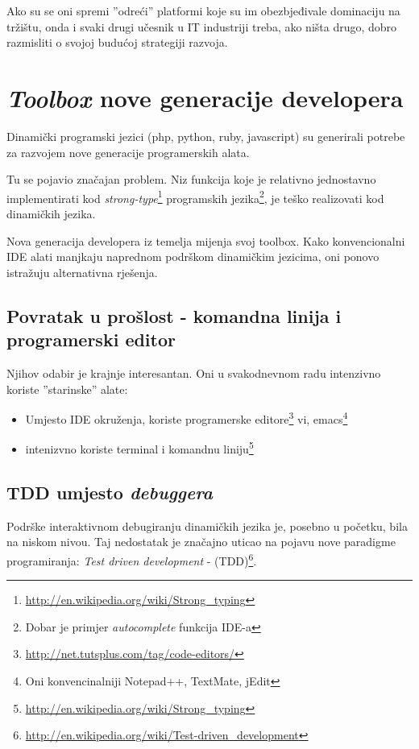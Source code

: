 \documentclass[times, utf8, seminar]{fit}
\begin{document}
Ako su se oni spremi ''odreći'' platformi koje su im obezbjeđivale dominaciju na tržištu, onda i svaki drugi učesnik u IT industriji treba, ako ništa drugo, dobro razmisliti o svojoj budućoj strategiji razvoja. 

\chapter{\emph{Toolbox} nove generacije developera}

Dinamički programski jezici (php, python, ruby, javascript) su generirali potrebe za razvojem nove generacije programerskih alata. 

Tu se pojavio značajan problem. Niz funkcija koje je relativno jednostavno implementirati kod \emph{strong-type}\footnote{\url{http://en.wikipedia.org/wiki/Strong_typing}} programskih jezika\footnote{Dobar je primjer \emph{autocomplete} funkcija IDE-a}, je teško realizovati kod dinamičkih jezika.

Nova generacija developera iz temelja mijenja svoj toolbox. Kako konvencionalni IDE alati manjkaju naprednom podrškom dinamičkim jezicima, oni ponovo istražuju alternativna rješenja.

\section{Povratak u prošlost - komandna linija i programerski editor}

Njihov odabir je krajnje interesantan. Oni u svakodnevnom radu intenzivno koriste ''starinske'' alate:
\begin{itemize}
  \item Umjesto IDE okruženja, koriste programerske editore\footnote{\url{http://net.tutsplus.com/tag/code-editors/}} vi, emacs\footnote{Oni konvencinalniji Notepad++, TextMate, jEdit}
  \item intenizvno koriste terminal i komandnu liniju\footnote{\url{http://en.wikipedia.org/wiki/Strong_typing}} 
\end{itemize}

\section{TDD umjesto \emph{debuggera}}

Podrške interaktivnom debugiranju dinamičkih jezika je, posebno u početku, bila na niskom nivou. Taj nedostatak je značajno uticao na pojavu nove paradigme programiranja: \emph{Test driven development} - (TDD)\footnote{\url{http://en.wikipedia.org/wiki/Test-driven_development}}.
\end{document}
